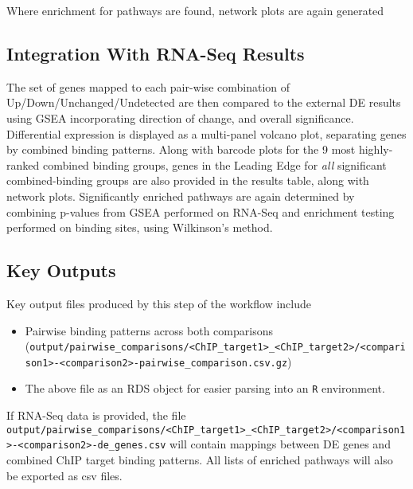 \documentclass[
]{book}
\providecommand{\tightlist}{%
  \setlength{\itemsep}{0pt}\setlength{\parskip}{0pt}}
\begin{document}
Where enrichment for pathways are found, network plots are again generated

\hypertarget{integration-with-rna-seq-results}{%
\subsection*{Integration With RNA-Seq Results}\label{integration-with-rna-seq-results}}

The set of genes mapped to each pair-wise combination of Up/Down/Unchanged/Undetected are then compared to the external DE results using GSEA incorporating direction of change, and overall significance.
Differential expression is displayed as a multi-panel volcano plot, separating genes by combined binding patterns.
Along with barcode plots for the 9 most highly-ranked combined binding groups, genes in the Leading Edge for \emph{all} significant combined-binding groups are also provided in the results table, along with network plots.
Significantly enriched pathways are again determined by combining p-values from GSEA performed on RNA-Seq and enrichment testing performed on binding sites, using Wilkinson's method.

\hypertarget{key-outputs-2}{%
\subsection{Key Outputs}\label{key-outputs-2}}

Key output files produced by this step of the workflow include

\begin{itemize}
\tightlist
\item
  Pairwise binding patterns across both comparisons (\texttt{output/pairwise\_comparisons/\textless{}ChIP\_target1\textgreater{}\_\textless{}ChIP\_target2\textgreater{}/\textless{}comparison1\textgreater{}-\textless{}comparison2\textgreater{}-pairwise\_comparison.csv.gz})
\item
  The above file as an RDS object for easier parsing into an \texttt{R} environment.
\end{itemize}

If RNA-Seq data is provided, the file \texttt{output/pairwise\_comparisons/\textless{}ChIP\_target1\textgreater{}\_\textless{}ChIP\_target2\textgreater{}/\textless{}comparison1\textgreater{}-\textless{}comparison2\textgreater{}-de\_genes.csv} will contain mappings between DE genes and combined ChIP target binding patterns.
All lists of enriched pathways will also be exported as csv files.
\end{document}
